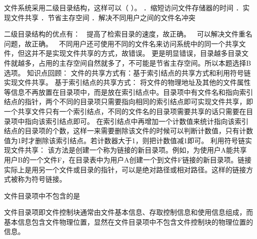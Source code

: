 \question 文件系统采用二级目录结构，这样可以（ ）。 ．缩短访问文件存储器的时间
．实现文件共享 ．节省主存空间 ．解决不同用户之间的文件名冲突
\par{}
\begin{solution}二级目录结构的优点有：  提高了检索目录的速度，故正确。 
可以解决文件重名问题，故正确。 
不同用户还可使用不同的文件名来访问系统中的同一个共享文件，但这并不是实现文件共享的方式，故错误。
更是明显错误，目录越多目录文件就越多，占用的主存空间自然就多了，不可能是节省主存空间。所以本题选择B选项。
知识点回顾：
文件的共享方式有：基于索引结点的共享方式和利用符号链实现文件共享。
基于索引结点的共享方式：
将文件的物理地址及其他的文件属性等信息不再放置在目录项中，而是放在索引结点中。目录项中有文件名和指向索引结点的指针，两个不同的目录项只需要指向相同的索引结点即可实现文件共享，即一个共享文件只有一个索引结点，不同的文件名的目录项需要共享的话只需要在目录项中指向该索引结点即可。
在索引结点中再增加一个计数值来统计指向该索引结点的目录项的个数，这样一来需要删除该文件的时候可以判断计数值，只有计数值为1时才删除该索引结点。若计数器大于1，则把计数值减1即可。
利用符号链实现文件共享：
该方法是创建一个称为链接的新目录项。例如，为使用户A能共享用户B的一个文件F，在目录表中为用户A创建一个到文件F链接的新目录项。链接实际上是用另一个文件或目录的指针，可以是绝对路径或相对路径。这样的链接方式被称为符号链接。
\end{solution}
\question 文件目录项中不包含的是
\par{}
\begin{solution}文件目录项即文件控制块通常由文件基本信息、存取控制信息和使用信息组成，而基本信息包含文件物理位置，显然在文件目录项中不包含文件控制块的物理位置的信息。
\end{solution}
